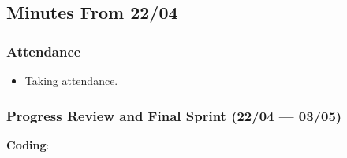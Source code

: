 \documentclass[11pt]{article}
\begin{document}
\hypertarget{minutes-from-2204}{%
\subsection{Minutes From 22/04}\label{minutes-from-2204}}

\hypertarget{attendance-5}{%
\subsubsection{Attendance}\label{attendance-5}}

\begin{itemize}
\tightlist
\item
  Taking attendance.
\end{itemize}

\hypertarget{progress-review-and-final-sprint-2204-0305}{%
\subsubsection{Progress Review and Final Sprint (22/04 ---
03/05)}\label{progress-review-and-final-sprint-2204-0305}}

\textbf{Coding}:
\end{document}

